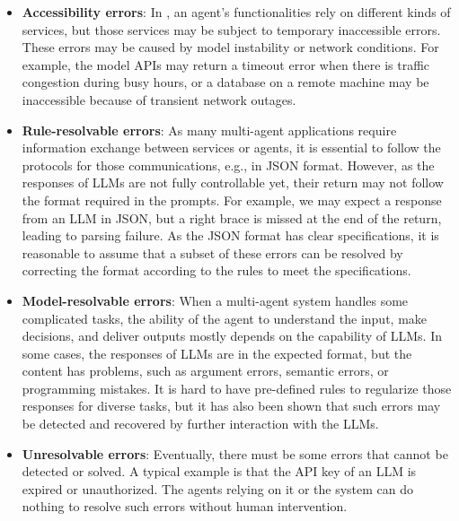 \begin{itemize}
    \item 
    \textbf{Accessibility errors}:
    In \ours, an agent's functionalities rely on different kinds of services, but those services may be subject to temporary inaccessible errors.
    These errors may be caused by model instability or network conditions.
    For example, the model APIs may return a timeout error when there is traffic congestion during busy hours, or a database on a remote machine may be inaccessible because of transient network outages.
    \item 
    \textbf{Rule-resolvable errors}:
    As many multi-agent applications require information exchange between services or agents, it is essential to follow the protocols for those communications, e.g., in JSON format.
    However, as the responses of LLMs are not fully controllable yet, their return may not follow the format required in the prompts.
    For example, we may expect a response from an LLM in JSON, but a right brace is missed at the end of the return, leading to parsing failure.
    As the JSON format has clear specifications, it is reasonable to assume that a subset of these errors can be resolved by correcting the format according to the rules to meet the specifications.
    \item 
    \textbf{Model-resolvable errors}:
    When a multi-agent system handles some complicated tasks, the ability of the agent to understand the input, make decisions, and deliver outputs mostly depends on the capability of LLMs.
    In some cases, the responses of LLMs are in the expected format, but the content has problems, such as argument errors, semantic errors, or programming mistakes.
    It is hard to have pre-defined rules to regularize those responses for diverse tasks, but it has also been shown that such errors may be detected and recovered by further interaction with the LLMs.
    \item 
    \textbf{Unresolvable errors}:
    Eventually, there must be some errors that cannot be detected or solved.
    A typical example is that the API key of an LLM is expired or unauthorized.
    The agents relying on it or the system can do nothing to resolve such errors without human intervention.
\end{itemize}

